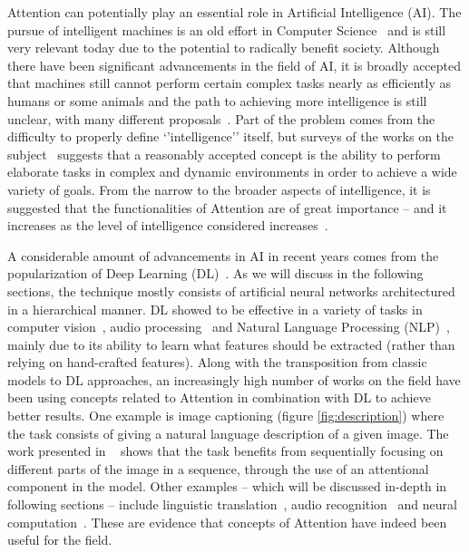 \documentclass[English]{style/ic-tese-v3}
\begin{document}
Attention can potentially play an essential role in Artificial Intelligence (AI).
The pursue of intelligent machines is an old effort in Computer Science~\cite{ref:turing} and is still very
relevant today due to the potential to radically benefit society.
Although there have been significant advancements in the field of AI, it is broadly accepted that
machines still cannot perform certain complex tasks nearly as efficiently as humans or some animals and
the path to achieving more intelligence is still unclear, with many different proposals~\cite{ref:mikolov}.
Part of the problem comes from the difficulty to properly define `'intelligence'' itself, but
surveys of the works on the subject~\cite{ref:aidef} suggests that a reasonably accepted
concept is the ability to perform elaborate tasks in complex and dynamic environments
in order to achieve a wide variety of goals.
From the narrow to the broader aspects of intelligence, it is suggested that the functionalities of Attention
are of great importance -- and it increases
as the level of intelligence considered increases~\cite{ref:helgason}.

A considerable amount of advancements in AI in recent years comes from
the popularization of Deep Learning (DL)~\cite{ref:dl}.
As we will discuss in the following sections, the technique mostly consists of
artificial neural networks architectured in a hierarchical manner.
DL showed to be effective in a variety of tasks in computer vision~\cite{ref:imagenet}\cite{ref:segmentation},
audio processing~\cite{ref:wavenet} and Natural Language
Processing (NLP)~\cite{ref:att-all-you-need}, mainly due to its ability
to learn what features should be extracted (rather than relying on hand-crafted features).
Along with the transposition from classic models to DL
approaches, an increasingly high number of works on the field
have been using concepts related to Attention in combination with DL to achieve better results.
One example is image captioning (figure \ref{fig:description}) where the task
consists of giving a natural language description of a given image.
The work presented in ~\cite{ref:img-captioning} shows that the task benefits from
sequentially focusing on different parts of the image in a sequence,
through the use of an attentional component in the model.
Other examples -- which will be discussed in-depth in following sections -- include linguistic
translation~\cite{ref:translation}, audio recognition~\cite{ref:audio} and neural computation~\cite{ref:ntm}.
These are evidence that concepts of Attention have indeed been useful for the field.
\end{document}

